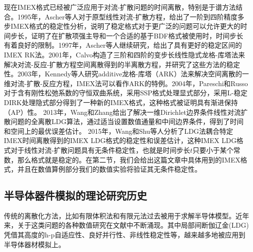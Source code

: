 现在IMEX格式已经被广泛应用于对流-扩散问题的时间离散，特别是于谱方法结合。1995年，Ascher等人对于原型线性对流-扩散方程，给出了一阶到四阶精度多步IMEX格式的稳定性分析，说明了稳定格式对于更广泛的问题可以允许更大的时间步长，证明了在扩散项强主导和一个合适的基于BDF格式被使用时，时间步长有着良好的限制\parencite{ascher1995implicit}。1997年，Ascher等人继续研究，给出了具有更好的稳定区间的IMEX RK法。2001年，Calvo构造了三阶和四阶的变步长线性隐式龙格-库塔法来解决对流-反应-扩散方程空间离散得到的半离散方程，并研究了这些方法的稳定性\cite{calvo2001linearly}。2003年，Kennedy等人研究additive龙格-库塔（ARK）法来解决空间离散的一维对流-扩散-反应方程，IMEX法可以看作ARK的特例。2004年，Pareschi和Russo对于含有刚性松弛系数的守恒双曲系统，采用SSP格式处理显式部分，采用L-稳定DIRK处理隐式部分得到了一种新的IMEX格式，这种格式被证明具有渐进保持（AP）性。
2013年，Wang和Zhang给出了解决一维Dirichlet边界条件线性对流扩散问题的全离散LDG算法，通过适当设置数值通量和中间边界条件，得到了时间和空间上的最优误差估计\cite{shu2007efficient}。
2015年，Wang和Shu等人分析了LDG法耦合特定IMEX时间离散得到的IMEX LDG格式的稳定性和误差估计，这种IMEX LDG格式对于线性对流-扩散问题具有无条件稳定性，也就是时间步长$t$只要小于某个常数，那么格式就是稳定的\cite{wang2015stability}。在第二节，我们会给出这篇文章中具体用到的IMEX格式，并且在数值算例部分我们的数值实验将验证其无条件稳定性。

\subsection{半导体器件模拟的理论研究历史}
传统的离散化方法，比如有限体积法\cite{bank1983numerical,bank1998finite,chainais2003finite,bessemoulin2012finite}和有限元法\cite{brezzi1989two,mauri20153d}过去被用于求解半导体模型。近年来，关于这类问题的各种数值研究在文献中不断涌现。其中局部间断伽辽金(LDG)凭借其高度的h-p自适应性、良好并行性、非线性稳定性等，越来越多地被应用到半导体器材模拟上。

